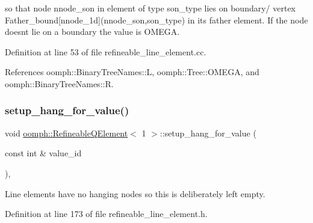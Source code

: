 so that node nnode\+\_\+son in element of type son\+\_\+type lies on boundary/ vertex Father\+\_\+bound\mbox{[}nnode\+\_\+1d\mbox{]}(nnode\+\_\+son,son\+\_\+type) in its father element. If the node doesn\textquotesingle{}t lie on a boundary the value is O\+M\+E\+GA. 

Definition at line 53 of file refineable\+\_\+line\+\_\+element.\+cc.



References oomph\+::\+Binary\+Tree\+Names\+::L, oomph\+::\+Tree\+::\+O\+M\+E\+GA, and oomph\+::\+Binary\+Tree\+Names\+::R.

\mbox{\label{classoomph_1_1RefineableQElement_3_011_01_4_aa5ea237de14d02f197a056de062392b7}} 
\subsubsection{\texorpdfstring{setup\+\_\+hang\+\_\+for\+\_\+value()}{setup\_hang\_for\_value()}}
{\footnotesize\ttfamily void \hyperlink{classoomph_1_1RefineableQElement}{oomph\+::\+Refineable\+Q\+Element}$<$ 1 $>$\+::setup\+\_\+hang\+\_\+for\+\_\+value (\begin{DoxyParamCaption}\item[{const int \&}]{value\+\_\+id }\end{DoxyParamCaption})\hspace{0.3cm}{\ttfamily [inline]}, {\ttfamily [protected]}}



Line elements have no hanging nodes so this is deliberately left empty. 



Definition at line 173 of file refineable\+\_\+line\+\_\+element.\+h.

\mbox{\label{classoomph_1_1RefineableQElement_3_011_01_4_a079b7ddf04c9597d2394f078e56aeb48}} 
